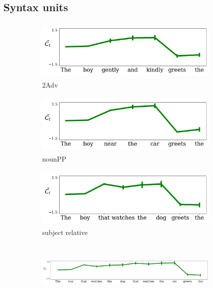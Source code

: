 \subsection{Syntax units}
\label{sec:syntax-units}

\begin{figure}[t]
    \begin{subfigure}{0.32\textwidth}
            \centering
            \includegraphics[width=\linewidth, height=3cm]{Figures/adv_conjunction_1149_cell}
            \caption{2Adv}
            \label{fig:syntax-unit-2Adv}
    \end{subfigure}
    \begin{subfigure}{0.32\textwidth}
            \centering
            \includegraphics[width=\linewidth, height=3cm]{Figures/nounpp_1149_cell.png}
            \caption{nounPP}
            \label{fig:syntax-unit-nounpp}
    \end{subfigure}
    \begin{subfigure}{0.32\textwidth}
            \centering
            \includegraphics[width=\linewidth, height=3cm]{Figures/subjrel_that_1149_cell.png}
            \caption{subject relative}
            \label{fig:syntax-unit-subjrel}
    \end{subfigure}
    \begin{subfigure}{\textwidth}
            \centering
            \includegraphics[width=\linewidth, height=3cm]{Figures/double_subjrel_that_1149_cell.png}

\end{subfigure}
\end{figure}
